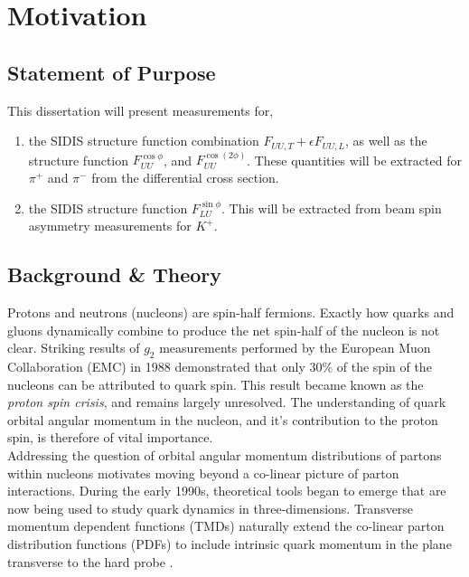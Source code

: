 \section{Motivation}

\subsection{Statement of Purpose}
This dissertation will present measurements for, 

\begin{enumerate}
  \item the SIDIS structure function combination $F_{UU,T} + \epsilon F_{UU,L}$, as well as the structure function $F_{UU}^{\cos\phi}$, and $F_{UU}^{\cos(2\phi)}$.  These quantities will be extracted for $\pi^+$ and $\pi^-$ from the differential cross section.
  \item the SIDIS structure function $F_{LU}^{\sin\phi}$.  This will be extracted from beam spin asymmetry measurements for $K^{+}$.
\end{enumerate}

\subsection{Background \& Theory}
Protons and neutrons (nucleons) are spin-half fermions.  Exactly how quarks and gluons dynamically combine to produce the net spin-half of the nucleon is not clear.  Striking results of $g_2$ measurements performed by the European Muon Collaboration (EMC) in 1988 \cite{pdfs-leader:1988} demonstrated that only $30\%$ of the spin of the nucleons can be attributed to quark spin.  This result became known as the \textit{proton spin crisis}, and remains largely unresolved.  The understanding of quark orbital angular momentum in the nucleon, and it's contribution to the proton spin, is therefore of vital importance.  \\

Addressing the question of orbital angular momentum distributions of partons within nucleons motivates moving beyond a co-linear picture of parton interactions.   During the early 1990s, theoretical tools began to emerge that are now being used to study quark dynamics in three-dimensions.  Transverse momentum dependent functions (TMDs) naturally extend the co-linear parton distribution functions (PDFs) to include intrinsic quark momentum in the plane transverse to the hard probe \cite{tmds-mulders:1995, tmds-bacchetta:2006}.  \\

